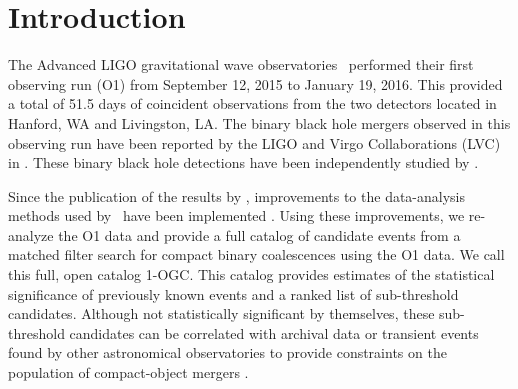 
\newcommand{\chieff}{\ensuremath{\chi_{\mathrm{eff}}}}
\newcommand{\rankingstat}{\ensuremath{\tilde{\rho}_c}}
\newcommand{\tdr}{\ensuremath{\mathrm{TDR}}}
\newcommand{\far}{\ensuremath{\mathcal{F}}}
\newcommand{\tar}{\ensuremath{\mathcal{T}}}
\newcommand{\msun}{\ensuremath{\mathrm{M}_{\odot}}}
\newcommand{\pastro}{\ensuremath{P_{\mathrm{astro}}}}
\newcommand{\release}{\texttt{\url{www.github.com/gwastro/1-ogc}}}

\section{Introduction}
\label{sec:intro}
The Advanced LIGO gravitational wave observatories~\citep{Martynov:2016fzi} performed their first observing run (O1) from September 12, 2015 to January 19, 2016. This provided a total of 51.5 days of coincident observations from the two detectors located in Hanford, WA and Livingston, LA. The binary black hole mergers observed in this observing run have been  reported by the LIGO and Virgo Collaborations (LVC) in \cite{Abbott:2016blz,Abbott:2016nmj,TheLIGOScientific:2016pea}.  These binary black hole detections have been independently studied by \cite{Green:2017voq,Roulet:2018jbe,Antelis:2018smo}.

Since the publication of the results by \cite{TheLIGOScientific:2016pea,Abbott:2016ymx}, improvements to the data-analysis methods used by~\citep{TheLIGOScientific:2016qqj} have been implemented \citep{Nitz:2017svb,Nitz:2017lco,DalCanton:2017ala}.  Using these improvements, we re-analyze the O1 data and provide a full catalog of candidate events from a matched filter search for compact binary coalescences using the O1 data. We call this full, open catalog 1-OGC. This catalog provides estimates of the statistical significance of previously known events and a ranked list of sub-threshold candidates. Although not statistically significant by themselves, these sub-threshold candidates can be correlated with archival data or transient events found by other astronomical observatories to provide constraints on the population of compact-object mergers \citep{Ashton:2017ykh, Burns:2018pcl}.

